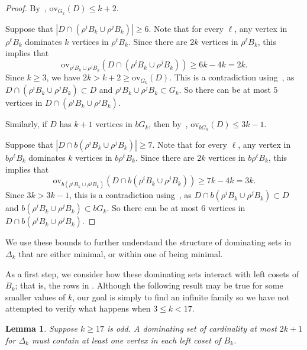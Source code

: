 \documentclass{amsart}
\newtheorem{lem}[thm]{Lemma}
\theoremstyle{remark}
\theoremstyle{definition}
\newcommand{\ov}{\mathrm{ov}}
\begin{document}
\begin{proof}
    By~, $\ov_{G_k}(D) \le k+2$. 

     Suppose that $|D\cap (\rho^iB_k\cup \rho^jB_k)|\ge 6.$  Note that for every $\ell$, any vertex in $\rho^\ell B_k$ dominates $k$ vertices in $\rho^\ell B_k$. Since there are $2k$ vertices in $\rho^\ell B_k$, this implies that $$\ov_{\rho^iB_k\cup \rho^jB_k}(D\cap (\rho^iB_k\cup \rho^jB_k)) \ge 6k-4k=2k.$$
    Since $k\ge 3$, we have $2k>k+2\ge\ov_{G_k}(D)$. This is a contradiction using~, as $D\cap (\rho^iB_k\cup \rho^jB_k) \subset D$ and $\rho^iB_k\cup \rho^jB_k \subset G_k$. So there can be at most $5$ vertices in $D\cap (\rho^iB_k\cup \rho^jB_k)$.
    
    
    Similarly, if $D$ has $k+1$ vertices in $bG_k$, then by~, $\ov_{bG_k}(D) \le 3k-1$.
    
      Suppose that $|D\cap b(\rho^iB_k\cup \rho^jB_k)|\ge 7.$ Note that for every $\ell$, any vertex in $b\rho^\ell B_k$ dominates $k$ vertices in $b\rho^\ell B_k$. Since there are $2k$ vertices in $b\rho^\ell B_k$, this implies that $$\ov_{b(\rho^iB_k\cup \rho^jB_k)}(D\cap b(\rho^iB_k\cup \rho^jB_k)) \ge 7k-4k=3k.$$
    Since $3k>3k-1$, this is a contradiction using~, as $D \cap b(\rho^iB_k\cup \rho^jB_k) \subset D$ and $b(\rho^iB_k\cup \rho^jB_k) \subset bG_k$. So there can be at most $6$ vertices in $D\cap b(\rho^iB_k\cup \rho^jB_k)$.
\end{proof}

We use these bounds to further understand the structure of dominating sets in $\Delta_k$ that are either minimal, or within one of being minimal. 

As a first step, we consider how these dominating sets interact with left cosets of $B_k$; that is, the rows in . Although the following result may be true for some smaller values of $k$, our goal is simply to find an infinite family so we have not attempted to verify what happens when $3 \le k < 17$. 

 

\begin{lem}\label{rows-covered}
    Suppose $k \ge 17$ is odd. A dominating set of cardinality at most $2k+1$ for $\Delta_k$ must contain at least one vertex in each left coset of $B_k$.
\end{lem}
\end{document}

